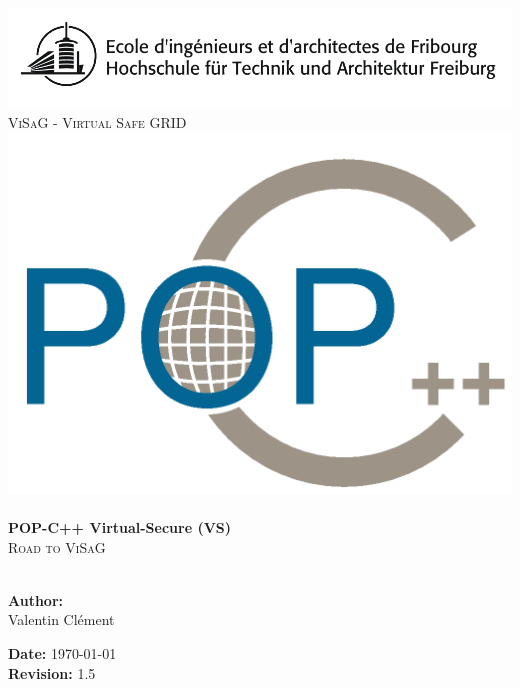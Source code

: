 
\begin{titlepage}
 
\begin{center}
\includegraphics[scale=0.3]{logo_eif.png}\\[1.5cm]
\textsc{\LARGE ViSaG - Virtual Safe GRID}\\[1.5cm]

\includegraphics[scale=0.3]{pic/logo_pop.png}\\[2cm]


\HRule \\[1cm]
{ \huge \bfseries POP-C++ Virtual-Secure (VS)}\\[0.5cm]
\textsc{\LARGE Road to ViSaG}\\[1cm]
 
\HRule \\[5cm]
 
\begin{minipage}{0.4\textwidth}
\begin{flushleft} \large
\textbf{Author:}\\
Valentin Clément
\end{flushleft}
\end{minipage}
\begin{minipage}{0.4\textwidth}
\begin{flushright} \large
\textbf{Date:} \today \\

\textbf{Revision:} 1.5
\end{flushright}
\end{minipage}
 
\vfill
  
\end{center}
 
\end{titlepage}
